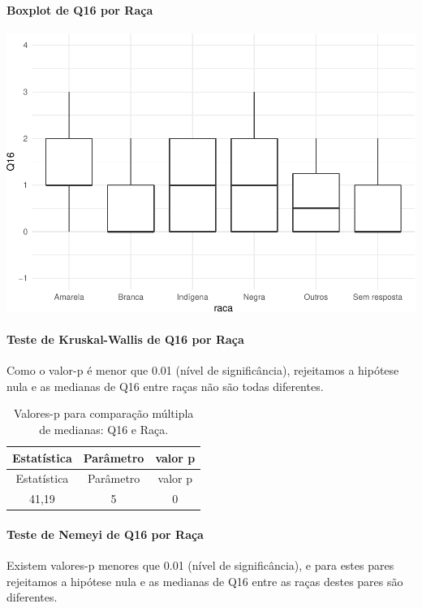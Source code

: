 \documentclass[]{article}
\let\oldparagraph\paragraph
\renewcommand{\paragraph}[1]{\oldparagraph{#1}\mbox{}}
\begin{document}
\hypertarget{boxplot-de-q16-por-rauxe7a}{%
\paragraph{Boxplot de Q16 por Raça}\label{boxplot-de-q16-por-rauxe7a}}

\begin{center}\includegraphics[width=0.75\linewidth]{relatorio_covid19_files/figure-latex/unnamed-chunk-165-1} \end{center}

\hypertarget{teste-de-kruskal-wallis-de-q16-por-rauxe7a}{%
\paragraph{Teste de Kruskal-Wallis de Q16 por Raça}\label{teste-de-kruskal-wallis-de-q16-por-rauxe7a}}

Como o valor-p é menor que 0.01 (nível de significância), rejeitamos a hipótese nula e as medianas de Q16 entre raças não são todas diferentes.

\begin{longtable}[]{@{}ccc@{}}
\caption{\label{tab:unnamed-chunk-167}Valores-p para comparação múltipla de medianas: Q16 e Raça.}\tabularnewline
\toprule
Estatística & Parâmetro & valor p\tabularnewline
\midrule
\endfirsthead
\toprule
Estatística & Parâmetro & valor p\tabularnewline
\midrule
\endhead
41,19 & 5 & 0\tabularnewline
\bottomrule
\end{longtable}

\hypertarget{teste-de-nemeyi-de-q16-por-rauxe7a}{%
\paragraph{Teste de Nemeyi de Q16 por Raça}\label{teste-de-nemeyi-de-q16-por-rauxe7a}}

Existem valores-p menores que 0.01 (nível de significância), e para estes pares rejeitamos a hipótese nula e as medianas de Q16 entre as raças destes pares são diferentes.
\end{document}
